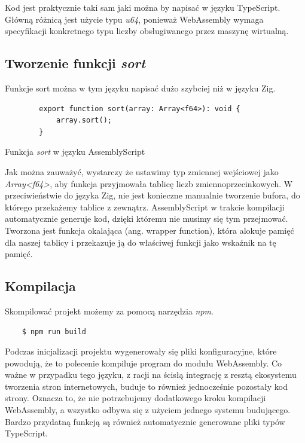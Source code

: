 \documentclass[language=polish,type=master]{aghmodern}
\begin{document}
Kod jest praktycznie taki sam jaki można by napisać w języku TypeScript.
Główną różnicą jest użycie typu \emph{u64}, ponieważ WebAssembly wymaga specyfikacji konkretnego typu liczby obsługiwanego przez maszynę wirtualną.

\subsection{Tworzenie funkcji \emph{sort}}

Funkcje sort można w tym języku napisać dużo szybciej niż w języku Zig.

\begin{listing}[H]
    \begin{verbatim}
        export function sort(array: Array<f64>): void {
            array.sort();
        }
    \end{verbatim}
    \caption{Funkcja \emph{sort} w języku AssemblyScript}
\end{listing}

Jak można zauważyć, wystarczy że ustawimy typ zmiennej wejściowej jako \emph{Array<f64>}, aby funkcja przyjmowała tablicę liczb zmiennoprzecinkowych.
W przeciwieństwie do języka Zig, nie jest konieczne manualnie tworzenie bufora, do którego przekażemy tablice z zewnątrz.
AssemblyScript w trakcie kompilacji automatycznie generuje kod, dzięki któremu nie musimy się tym przejmować.
Tworzona jest funkcja okalająca (ang. wrapper function), która alokuje pamięć dla naszej tablicy i przekazuje ją do właściwej funkcji jako wskaźnik na tę pamięć.

\subsection{Kompilacja}
Skompilować projekt możemy za pomocą narzędzia \emph{npm}.

\begin{verbatim}
    $ npm run build
\end{verbatim}

Podczas inicjalizacji projektu wygenerowały się pliki konfiguracyjne, które powodują, że to polecenie kompiluje program do modułu WebAssembly.
Co ważne w przypadku tego języku, z racji na ścisłą integrację z resztą ekosystemu tworzenia stron internetowych, buduje to również jednocześnie pozostały kod strony.
Oznacza to, że nie potrzebujemy dodatkowego kroku kompilacji WebAssembly, a wszystko odbywa się z użyciem jednego systemu budującego.
Bardzo przydatną funkcją są również automatycznie generowane pliki typów TypeScript.
\end{document}
